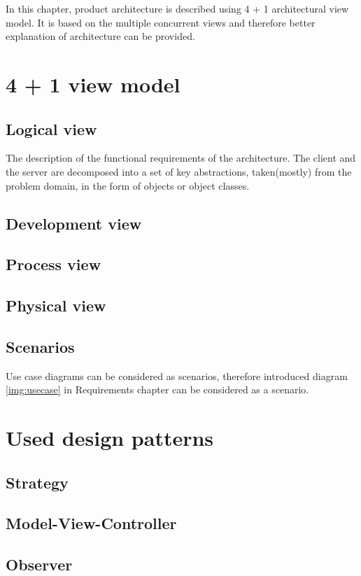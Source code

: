 In this chapter, product architecture is described using 4 + 1 architectural view model.
It is based on the multiple concurrent views and therefore better explanation of architecture can be provided.

\section{4 + 1 view model}
\subsection{Logical view}
The description of the functional requirements of the architecture. The client and the server are decomposed into a set of key abstractions, taken(mostly) from the problem domain, in the form of objects or object classes.

\subsection{Development view}
\subsection{Process view}
\subsection{Physical view}
\subsection{Scenarios}
Use case diagrams can be considered as scenarios, therefore introduced diagram \ref{img:usecase} in Requirements chapter can be considered as a scenario.

\section{Used design patterns}
\subsection{Strategy}
\subsection{Model-View-Controller}
\subsection{Observer}